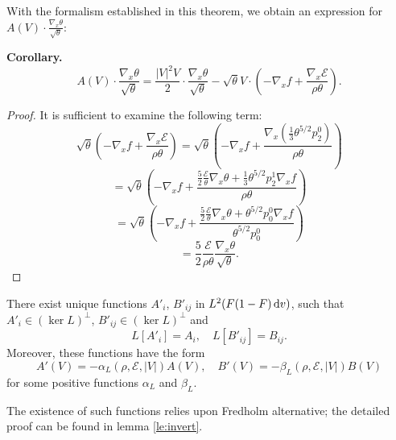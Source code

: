 With the formalism established in this theorem, we obtain an expression for $A(V)\cdot \frac{\nabla_x\theta}{\sqrt\theta}$:

\textbf{Corollary.}
\begin{equation}\label{eq:Atheta}
A(V)\cdot \frac{\nabla_x\theta}{\sqrt\theta}=\frac{|V|^2V}{2}\cdot \frac{\nabla_x\theta}{\sqrt\theta}  -
\sqrt\theta V\cdot\left(-\nabla_x f + \frac{\nabla_x
\mathcal E}{\rho\theta}\right).
\end{equation}
 
\begin{proof}
It is sufficient to examine the following term:
\[\sqrt\theta  \left(-\nabla_x f + \frac{\nabla_x
\mathcal E}{\rho\theta}\right)=\sqrt\theta  \left(-\nabla_x f + \frac{\nabla_x
\left(\frac{1}{3}\theta^{5/2}p^0_2\right)}{\rho\theta}\right)\]
\[=\sqrt\theta  \left(-\nabla_x f + \frac{\frac52\frac {\mathcal 
E}{\theta}\nabla_x\theta+
 \frac{1}{3}\theta^{5/2}p^1_2\nabla_x f }{\rho\theta}\right)\]
 \[=\sqrt\theta  \left(-\nabla_x f + \frac{\frac52\frac {\mathcal 
E}{\theta}\nabla_x\theta+
  \theta^{5/2}p^0_0\nabla_x f }{\theta^{5/2}p^0_0 }\right)\]
 \[=\frac52   \frac{\mathcal E}{\rho\theta} \frac{\nabla_x\theta}{\sqrt\theta}.  \]
 \end{proof}

 \begin{lemma}\label{le:invertform:main}
There exist unique functions $A'_i$, $B'_{ij}$ in $L^2(F(1-F){\,\mathrm{d} v})$, such that $A'_i\in(\ker L)^\bot$, $B'_{ij}\in (\ker L)^\bot$ and \[L[A'_i]=A_i,\quad L[B'_{ij}]=B_{ij}.\]
Moreover, these functions have the form
\[A'(V)= -\alpha_L(\rho,\mathcal E,|V|)A(V),\quad B'(V)= -\beta_L(\rho,\mathcal E,|V|)B(V)\]
for some positive functions $\alpha_L$ and $\beta_L$.
\end{lemma}
The existence of such functions relies upon Fredholm alternative; the detailed proof can be found in lemma \ref{le:invert}.%

 
